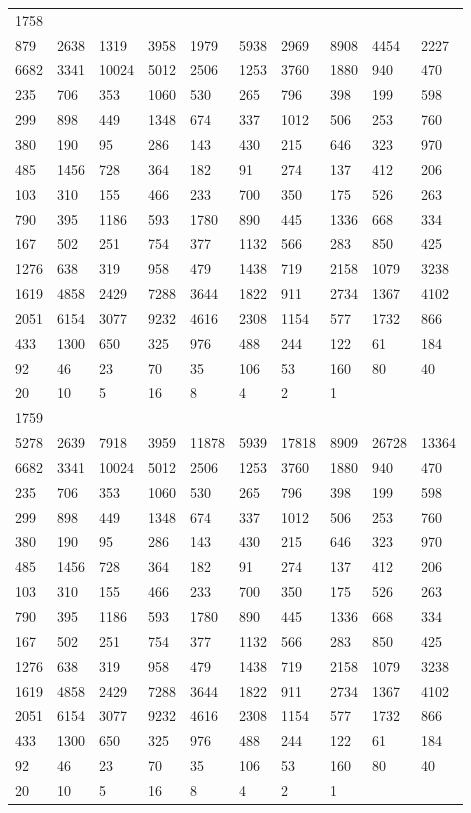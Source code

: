 \begin{longtable}{*{10}{l}}
1758&&&&&&&&&\\
879& 2638& 1319& 3958& 1979& 5938& 2969& 8908& 4454& 2227\\
6682& 3341& 10024& 5012& 2506& 1253& 3760& 1880& 940& 470\\
235& 706& 353& 1060& 530& 265& 796& 398& 199& 598\\
299& 898& 449& 1348& 674& 337& 1012& 506& 253& 760\\
380& 190& 95& 286& 143& 430& 215& 646& 323& 970\\
485& 1456& 728& 364& 182& 91& 274& 137& 412& 206\\
103& 310& 155& 466& 233& 700& 350& 175& 526& 263\\
790& 395& 1186& 593& 1780& 890& 445& 1336& 668& 334\\
167& 502& 251& 754& 377& 1132& 566& 283& 850& 425\\
1276& 638& 319& 958& 479& 1438& 719& 2158& 1079& 3238\\
1619& 4858& 2429& 7288& 3644& 1822& 911& 2734& 1367& 4102\\
2051& 6154& 3077& 9232& 4616& 2308& 1154& 577& 1732& 866\\
433& 1300& 650& 325& 976& 488& 244& 122& 61& 184\\
92& 46& 23& 70& 35& 106& 53& 160& 80& 40\\
20& 10& 5& 16& 8& 4& 2& 1& \\

1759&&&&&&&&&\\
5278& 2639& 7918& 3959& 11878& 5939& 17818& 8909& 26728& 13364\\
6682& 3341& 10024& 5012& 2506& 1253& 3760& 1880& 940& 470\\
235& 706& 353& 1060& 530& 265& 796& 398& 199& 598\\
299& 898& 449& 1348& 674& 337& 1012& 506& 253& 760\\
380& 190& 95& 286& 143& 430& 215& 646& 323& 970\\
485& 1456& 728& 364& 182& 91& 274& 137& 412& 206\\
103& 310& 155& 466& 233& 700& 350& 175& 526& 263\\
790& 395& 1186& 593& 1780& 890& 445& 1336& 668& 334\\
167& 502& 251& 754& 377& 1132& 566& 283& 850& 425\\
1276& 638& 319& 958& 479& 1438& 719& 2158& 1079& 3238\\
1619& 4858& 2429& 7288& 3644& 1822& 911& 2734& 1367& 4102\\
2051& 6154& 3077& 9232& 4616& 2308& 1154& 577& 1732& 866\\
433& 1300& 650& 325& 976& 488& 244& 122& 61& 184\\
92& 46& 23& 70& 35& 106& 53& 160& 80& 40\\
20& 10& 5& 16& 8& 4& 2& 1& \\


\end{longtable}
